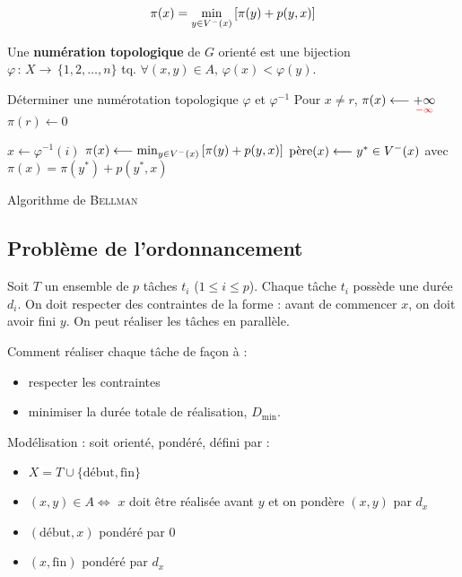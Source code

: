 \documentclass[a4paper, 8pt]{article}
\begin{document}
\begin{multicols*}{3}
\[ \pi(x) = \displaystyle \min_{y\in \Vm(x)}\left[\pi(y) + p(y,x)\right] \]

Une \textbf{numération topologique} de $G$ orienté est une bijection $\varphi\,:\,X\rightarrow\,\{1,2,\ldots,n\}$ tq. $\forall (x,y)\in A, \,\varphi(x) < \varphi(y)$.


\begin{algorithm}[H]
 Déterminer une numérotation topologique $\varphi$ et $\varphi^{-1}$ \;
 Pour $x\neq r$, $\pi(x) \longleftarrow \underset{\tred{-\infty}}{+\infty}$\;
 $\pi(r) \longleftarrow 0$ \;
 
 {
 	$x \longleftarrow \varphi^{-1}(i)$ \;
 	$\pi(x) \longleftarrow \min_{y\in \Vm(x)}\left[\pi(y) + p(y,x)\right]$ \;
 	{\footnotesize {} }
 	$\pere(x) \longleftarrow y^*\in \Vm(x)$ avec $\pi(x) = \pi(y^*) + p(y^*,x)$ \;
 }
 
 \caption{Algorithme de \textsc{Bellman}}
\end{algorithm}

 \subsection*{Problème de l'ordonnancement}
 
\newcommand{\Dmin}{D_{\text{min}}} 
\newcommand{\debut}{\text{début}}
\newcommand{\fin}{\text{fin}}
 
 Soit $T$ un ensemble de $p$ tâches $t_i$ ($1\leqslant i\leqslant p$). Chaque tâche $t_i$ possède une durée $d_i$. On doit respecter des contraintes de la forme : avant de commencer $x$, on doit avoir fini $y$. On peut réaliser les tâches en parallèle.
 
Comment réaliser chaque tâche de façon à :
\begin{itemize}
	\item respecter les contraintes
	\item minimiser la durée totale de réalisation, $\Dmin$.
\end{itemize}

Modélisation : soit \GXA orienté, pondéré, défini par :
\begin{itemize}
	\item $X = T \cup \{\debut,\fin\}$
	\item $(x,y)\in A \Longleftrightarrow$ $x$ doit être réalisée avant $y$ et on pondère $(x,y)$ par $d_x$
	\item $(\debut,x)$ pondéré par 0
	\item $(x,\fin)$ pondéré par $d_x$
\end{itemize}


\end{multicols*}
\end{document}
